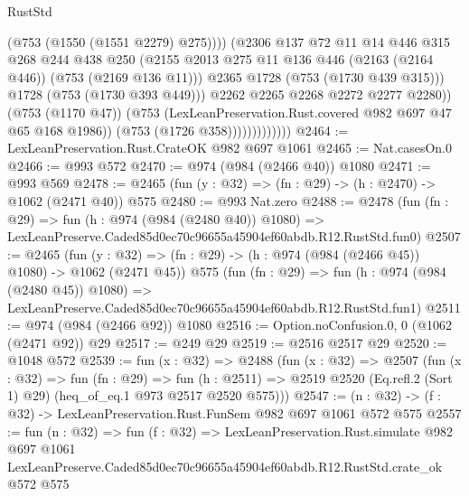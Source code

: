 \begin{lexlean}{RustStd}
\begin{coremodule}
                                    (@753 (@1550 (@1551 @2279) @275))))
                                (@2306
                                  @137
                                  @72
                                  @11
                                  @14
                                  @446
                                  @315
                                  @268
                                  @244
                                  @438
                                  @250
                                  (@2155
                                    @2013
                                    @275
                                    @11
                                    @136
                                    @446
                                    (@2163 (@2164 @446))
                                    (@753 (@2169 @136 @11)))
                                  @2365
                                  @1728
                                  (@753 (@1730 @439 @315)))
                                @1728
                                (@753 (@1730 @393 @449)))
                              @2262
                              @2265
                              @2268
                              @2272
                              @2277
                              @2280))
                          (@753 (@1170 @47))
                          (@753 (LexLeanPreservation.Rust.covered @982 @697 @47 @65 @168 @1986))
                          (@753 (@1726 @358)))))))))))))
@2464 := LexLeanPreservation.Rust.CrateOK @982 @697 @1061
@2465 := Nat.casesOn.{0}
@2466 := @993 @572
@2470 := @974 (@984 (@2466 @40)) @1080
@2471 := @993 @569
@2478 := @2465 (fun (y : @32) => (fn : @29) -> (h : @2470) -> @1062 (@2471 @40)) @575
@2480 := @993 Nat.zero
@2488 := @2478
    (fun (fn : @29) =>
    fun (h : @974 (@984 (@2480 @40)) @1080) =>
    LexLeanPreserve.Caded85d0ec70c96655a45904ef60abdb.R12.RustStd.fun0)
@2507 := @2465
    (fun (y : @32) => (fn : @29) -> (h : @974 (@984 (@2466 @45)) @1080) -> @1062 (@2471 @45))
    @575
    (fun (fn : @29) =>
    fun (h : @974 (@984 (@2480 @45)) @1080) =>
    LexLeanPreserve.Caded85d0ec70c96655a45904ef60abdb.R12.RustStd.fun1)
@2511 := @974 (@984 (@2466 @92)) @1080
@2516 := Option.noConfusion.{0, 0} (@1062 (@2471 @92)) @29
@2517 := @249 @29
@2519 := @2516 @2517 @29
@2520 := @1048 @572
@2539 := fun (x : @32) =>
  @2488
    (fun (x : @32) =>
    @2507
      (fun (x : @32) =>
      fun (fn : @29) =>
      fun (h : @2511) =>
      @2519 @2520 (Eq.refl.{2} (Sort 1) @29) (heq_of_eq.{1} @973 @2517 @2520 @575)))
@2547 := (n : @32) -> (f : @32) -> LexLeanPreservation.Rust.FunSem @982 @697 @1061 @572 @575
@2557 := fun (n : @32) =>
  fun (f : @32) =>
  LexLeanPreservation.Rust.simulate
    @982
    @697
    @1061
    LexLeanPreserve.Caded85d0ec70c96655a45904ef60abdb.R12.RustStd.crate_ok
    @572
    @575
\end{coremodule}
\end{lexlean}
